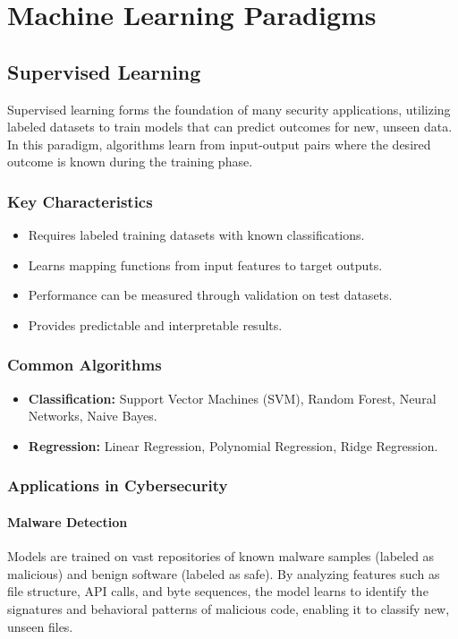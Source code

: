 \documentclass[12pt]{report}
\begin{document}
\section{Machine Learning Paradigms}

\subsection{Supervised Learning}
Supervised learning forms the foundation of many security applications, utilizing labeled datasets to train models that can predict outcomes for new, unseen data. In this paradigm, algorithms learn from input-output pairs where the desired outcome is known during the training phase.

\subsubsection{Key Characteristics}
\begin{itemize}
    \item Requires labeled training datasets with known classifications.
    \item Learns mapping functions from input features to target outputs.
    \item Performance can be measured through validation on test datasets.
    \item Provides predictable and interpretable results.
\end{itemize}

\subsubsection{Common Algorithms}
\begin{itemize}
    \item \textbf{Classification:} Support Vector Machines (SVM), Random Forest, Neural Networks, Naive Bayes.
    \item \textbf{Regression:} Linear Regression, Polynomial Regression, Ridge Regression.
\end{itemize}

\subsubsection{Applications in Cybersecurity}
\paragraph{Malware Detection}
Models are trained on vast repositories of known malware samples (labeled as malicious) and benign software (labeled as safe). By analyzing features such as file structure, API calls, and byte sequences, the model learns to identify the signatures and behavioral patterns of malicious code, enabling it to classify new, unseen files.
\end{document}
